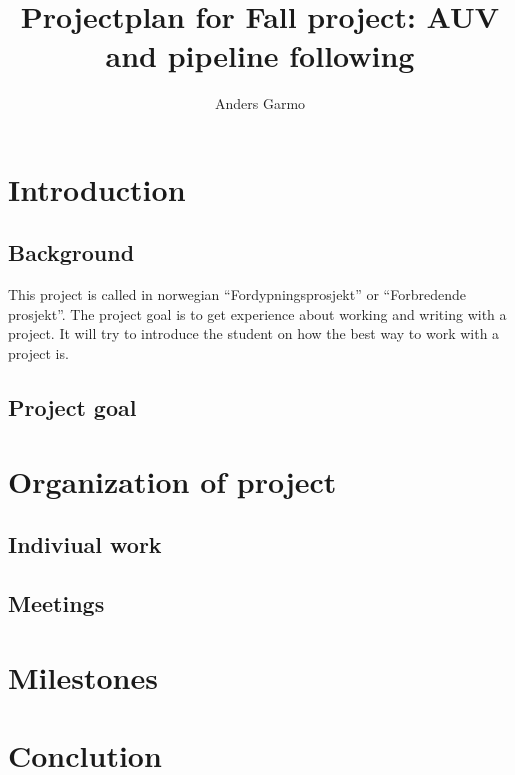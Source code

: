 \documentclass[a4paper,10pt]{report}
\title{Projectplan for Fall project: AUV and pipeline following}
\author{Anders Garmo}
\begin{document}
\maketitle

\tableofcontents

\section{Introduction}

	\subsection{Background}
	This project is called in norwegian ``Fordypningsprosjekt'' or ``Forbredende prosjekt''. The project goal is to get experience about working and writing with a project. It will try to introduce the student on how the best way to work with a project is. 
	
	\subsection{Project goal}
	
	
	
\section{Organization of project}
	\subsection{Indiviual work}
	
	\subsection{Meetings}

\section{Milestones}

\section{Conclution}
\end{document}
